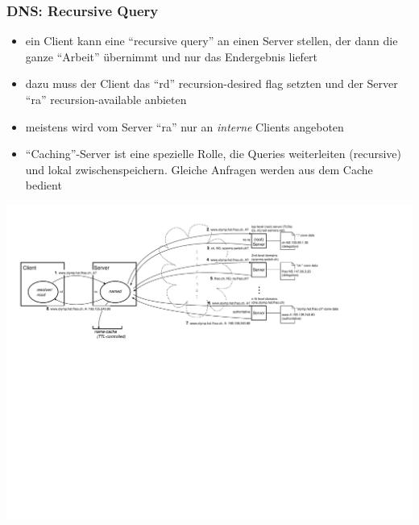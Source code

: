 \documentclass[ignorenonframetext]{beamer}
\begin{document}
\begin{frame}\label{recursive-query}
\frametitle{DNS: Recursive Query}
\begin{itemize}
	\item{ein Client kann eine ``recursive query'' an einen Server stellen, der dann die ganze ``Arbeit'' \"ubernimmt und nur das Endergebnis liefert}
	\item{\begin{tiny}dazu muss der Client das ``rd'' recursion-desired flag setzten und der Server ``ra'' recursion-available anbieten\end{tiny}}
	\item{\begin{tiny}meistens wird vom Server ``ra'' nur an {\em interne} Clients angeboten\end{tiny}}
	\item ``Caching''-Server ist eine spezielle Rolle, die Queries weiterleiten (recursive) und lokal zwischenspeichern. Gleiche Anfragen werden aus dem Cache bedient
	\end{itemize}
\hspace{-0.5cm}\vspace{-1cm}
\includegraphics[width=15cm]{dns-recursive}
\end{frame}
\end{document}
